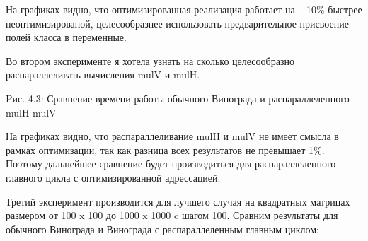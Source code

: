 \documentclass[12pt]{report}
\begin{document}
На графиках видно, что оптимизированная реализация работает на ~ 10\% быстрее неоптимизированой, целесообразнее использовать предварительное присвоение полей класса в переменные.

Во втором эксперименте я хотела узнать на сколько целесообразно распараллеливать вычисления mulV и mulH.

\begin{center}
Pис. 4.3: Сравнение времени работы обычного Винограда и распараллеленного mulH mulV
\end{center}

На графиках видно, что распараллеливание mulH и mulV не имеет смысла в рамках оптимизации, так как разница всех результатов не превышает 1\%.
Поэтому дальнейшее сравнение будет производиться для распараллеленного главного цикла с оптимизированной адрессацией.  

Третий эксперимент производится для лучшего случая на квадратных матрицах размером от 100 x 100 до 1000 x 1000 c шагом 100. 
Сравним результаты для обычного Винограда и Винограда с распараллеленным главным циклом:
\end{document}
